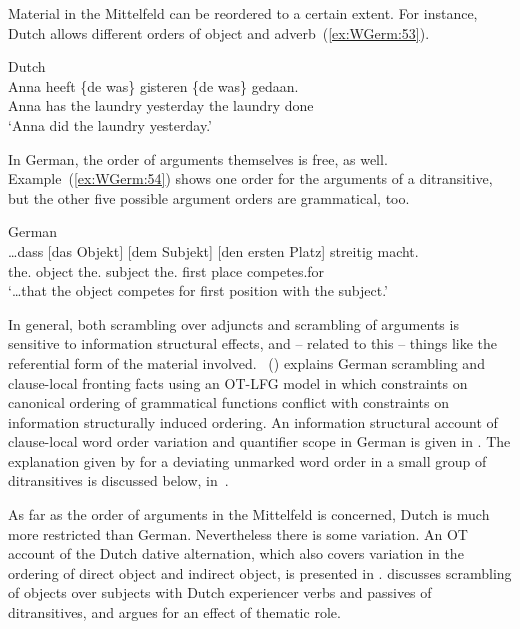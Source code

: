 \documentclass[output=paper,hidelinks]{langscibook}
\begin{document}
Material in the Mittelfeld can be reordered to a certain extent. For
instance, Dutch allows different orders of object and
adverb~(\ref{ex:WGerm:53}). 
%
\begin{exe}
  \ex\label{ex:WGerm:53} Dutch\\
    \gll Anna heeft \{de was\} gisteren \{de was\} gedaan.\\
    Anna has \phantom{\{}the laundry yesterday  \phantom{\{}the laundry done\\
    \glt `Anna did the laundry yesterday.'
\end{exe}
%
In German, the order of arguments themselves is free, as
well. Example~(\ref{ex:WGerm:54}) shows one order for the arguments of a
ditransitive, but the other five possible argument orders are
grammatical, too.
%
\begin{exe}
    \ex\label{ex:WGerm:54} German \citep[§1, example~1]{haider-rosengren:2003}\\
    \gll \ldots{}dass $[$das Objekt$]$ $[$dem Subjekt] $[$den ersten Platz] {streitig macht}.\\
             \phantom{\ldots}\COMP{} \phantom{$[$}the.\NOM{} object \phantom{$[$}the.\DAT{} subject \phantom{$[$}the.\ACC{} first place competes.for \\
        \glt `\ldots that the object competes for first position with the subject.'
\end{exe}
%       
In general, both scrambling over adjuncts and scrambling of arguments
is sensitive to information structural effects, and -- related to this
-- things like the referential form of the material involved.
\citeauthor{Choi1999}~(\citeyear{Choi1999,Choi2001}) explains German scrambling and
clause-local fronting facts using an OT-LFG model in which constraints
on canonical ordering of grammatical functions conflict with
constraints on information structurally induced ordering. An
information structural account of clause-local word order variation
and quantifier scope in German is given in
\citet{CookPayne}. The explanation given by
\citet{cook:2006:benjamins} for a deviating unmarked
word order in a small group of ditransitives is discussed below,
in~.

As far as the order of arguments in the Mittelfeld is concerned, Dutch
is much more restricted than German. Nevertheless there is some
variation. An OT account of the Dutch dative alternation, which also
covers variation in the ordering of direct object and indirect object, is
presented in . \citet{zaenen:1989:techreport}
discusses scrambling of objects over subjects with Dutch experiencer
verbs and passives of ditransitives, and argues for an effect of
thematic role.
\end{document}
